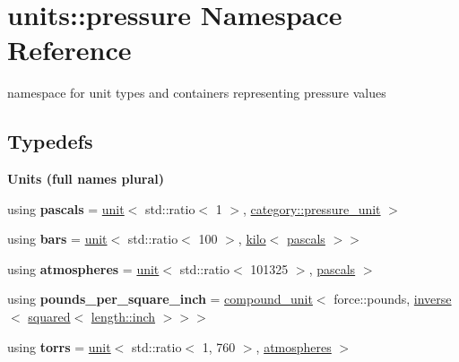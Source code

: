 \hypertarget{namespaceunits_1_1pressure}{}\section{units\+:\+:pressure Namespace Reference}
\label{namespaceunits_1_1pressure}


namespace for unit types and containers representing pressure values  


\subsection*{Typedefs}
\begin{Indent}{\bf Units (full names plural)}\par
\begin{DoxyCompactItemize}
\item 
\hypertarget{namespaceunits_1_1pressure_a45b811a04d340ddfee839a28fc64feb3}{}using {\bfseries pascals} = \hyperlink{structunits_1_1unit}{unit}$<$ std\+::ratio$<$ 1 $>$, \hyperlink{namespaceunits_1_1category_adf9fa681139dac718dc7455ca2d5e11f}{category\+::pressure\+\_\+unit} $>$\label{namespaceunits_1_1pressure_a45b811a04d340ddfee839a28fc64feb3}

\item 
\hypertarget{namespaceunits_1_1pressure_a7163a40c805b8067a63b1700929c55d6}{}using {\bfseries bars} = \hyperlink{structunits_1_1unit}{unit}$<$ std\+::ratio$<$ 100 $>$, \hyperlink{group___unit_manipulators_ga89965a45aaa6689548b9c53858759c5e}{kilo}$<$ \hyperlink{structunits_1_1unit}{pascals} $>$$>$\label{namespaceunits_1_1pressure_a7163a40c805b8067a63b1700929c55d6}

\item 
\hypertarget{namespaceunits_1_1pressure_a16b7e818ee4ca02b34c41ce42f7c966e}{}using {\bfseries atmospheres} = \hyperlink{structunits_1_1unit}{unit}$<$ std\+::ratio$<$ 101325 $>$, \hyperlink{structunits_1_1unit}{pascals} $>$\label{namespaceunits_1_1pressure_a16b7e818ee4ca02b34c41ce42f7c966e}

\item 
\hypertarget{namespaceunits_1_1pressure_aeb851238822831e34a64c2132d2f148f}{}using {\bfseries pounds\+\_\+per\+\_\+square\+\_\+inch} = \hyperlink{group___unit_types_ga9c3f6f077dc894620e1ed8358442a8f1}{compound\+\_\+unit}$<$ force\+::pounds, \hyperlink{group___unit_manipulators_gaacc539ef162e24b260d023d3ff949b57}{inverse}$<$ \hyperlink{group___unit_manipulators_ga636346f7898c35eb98a796bec1d77fb2}{squared}$<$ \hyperlink{structunits_1_1unit}{length\+::inch} $>$$>$$>$\label{namespaceunits_1_1pressure_aeb851238822831e34a64c2132d2f148f}

\item 
\hypertarget{namespaceunits_1_1pressure_a9ee06083c4d8cbdd5db59a745804269b}{}using {\bfseries torrs} = \hyperlink{structunits_1_1unit}{unit}$<$ std\+::ratio$<$ 1, 760 $>$, \hyperlink{structunits_1_1unit}{atmospheres} $>$\label{namespaceunits_1_1pressure_a9ee06083c4d8cbdd5db59a745804269b}

\end{DoxyCompactItemize}
\end{Indent}
